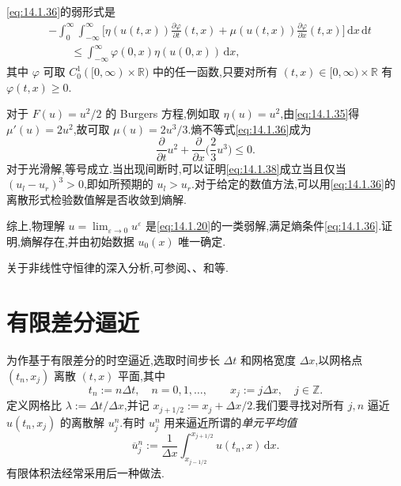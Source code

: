 \eqref{eq:14.1.36}的弱形式是
\begin{equation}\label{eq:14.1.37}
  \begin{aligned}
    &-\int_0^\infty\!\!\int_{-\infty}^\infty
     \biggl[\eta(u(t,x))\frac{\partial\varphi}{\partial t}(t,x)
           +\mu(u(t,x))\frac{\partial\varphi}{\partial x}(t,x)\biggr]
                   \,\mathrm dx\,\mathrm dt\\
    &\qquad\le\int_{-\infty}^\infty\varphi(0,x)\eta(u(0,x))\,\mathrm dx,
  \end{aligned}
\end{equation}
其中 \(\varphi\) 可取 \(C_0^1([0,\infty)\times\mathbb R)\) 中的任一函数,只要对所有 \((t,x)\in[0,\infty)\times\mathbb R\) 有 \(\varphi(t,x)\ge0\).

对于 \(F(u)=u^2/2\) 的 Burgers 方程,例如取 \(\eta(u)=u^2\),由\eqref{eq:14.1.35}得 \(\mu'(u)=2u^2\),故可取 \(\mu(u)=2u^3/3\).熵不等式\eqref{eq:14.1.36}成为
\begin{equation}\label{eq:14.1.38}
  \frac{\partial}{\partial t}u^2+\frac{\partial}{\partial x}\biggl(\frac23u^3\biggr)\le0.
\end{equation}
对于光滑解,等号成立.当出现间断时,可以证明\eqref{eq:14.1.38}成立当且仅当 \((u_l-u_r)^3>0\),即如所预期的 \(u_l>u_r\).对于给定的数值方法,可以用\eqref{eq:14.1.36}的离散形式检验数值解是否收敛到熵解.

综上,物理解 \(u=\lim_{\varepsilon\to0}u^\varepsilon\) 是\eqref{eq:14.1.20}的一类弱解,满足熵条件\eqref{eq:14.1.36}.证明,熵解存在,并由初始数据 \(u_0(x)\) 唯一确定.

关于非线性守恒律的深入分析,可参阅、、和等.

\section{有限差分逼近}\label{sec:14.2}

为作基于有限差分的时空逼近,选取时间步长 \(\Delta t\) 和网格宽度 \(\Delta x\),以网格点 \((t_n,x_j)\) 离散 \((t,x)\) 平面,其中
\[
  t_n:=n\Delta t,\quad n=0,1,\ldots,\qquad
  x_j:=j\Delta x,\quad j\in\mathbb Z.
\]
定义网格比 \(\lambda:=\Delta t/\Delta x\),并记 \(x_{j+1/2}:=x_j+\Delta x/2\).我们要寻找对所有 \(j,n\) 逼近 \(u(t_n,x_j)\) 的离散解 \(u_j^n\).有时 \(u_j^n\) 用来逼近所谓的\emph{单元平均值}
\[
  \overline u_j^n:=\frac1{\Delta x}
    \int_{x_{j-1/2}}^{x_{j+1/2}}u(t_n,x)\,\mathrm dx.
\]
有限体积法经常采用后一种做法.

